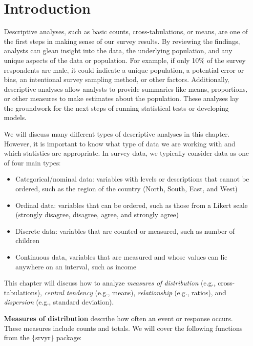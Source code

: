 \documentclass[
]{krantz}
\providecommand{\tightlist}{%
  \setlength{\itemsep}{0pt}\setlength{\parskip}{0pt}}
\begin{document}
\hypertarget{introduction-4}{%
\section{Introduction}\label{introduction-4}}

Descriptive analyses, such as basic counts, cross-tabulations, or means, are one of the first steps in making sense of our survey results. By reviewing the findings, analysts can glean insight into the data, the underlying population, and any unique aspects of the data or population. For example, if only 10\% of the survey respondents are male, it could indicate a unique population, a potential error or bias, an intentional survey sampling method, or other factors. Additionally, descriptive analyses allow analysts to provide summaries like means, proportions, or other measures to make estimates about the population. These analyses lay the groundwork for the next steps of running statistical tests or developing models.

We will discuss many different types of descriptive analyses in this chapter. However, it is important to know what type of data we are working with and which statistics are appropriate. In survey data, we typically consider data as one of four main types:

\begin{itemize}
\tightlist
\item
  Categorical/nominal data: variables with levels or descriptions that cannot be ordered, such as the region of the country (North, South, East, and West)
\item
  Ordinal data: variables that can be ordered, such as those from a Likert scale (strongly disagree, disagree, agree, and strongly agree)
\item
  Discrete data: variables that are counted or measured, such as number of children
\item
  Continuous data, variables that are measured and whose values can lie anywhere on an interval, such as income
\end{itemize}

This chapter will discuss how to analyze \emph{measures of distribution} (e.g., cross-tabulations), \emph{central tendency} (e.g., means), \emph{relationship} (e.g., ratios), and \emph{dispersion} (e.g., standard deviation).

\textbf{Measures of distribution} describe how often an event or response occurs. These measures include counts and totals. We will cover the following functions from the \{srvyr\} package:
\end{document}
